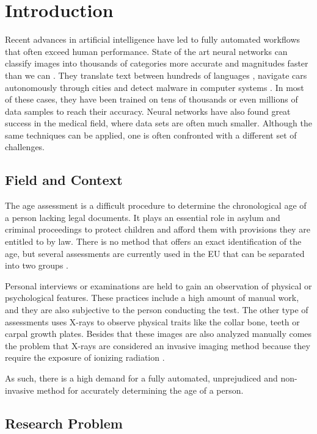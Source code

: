 \section{Introduction}

Recent advances in artificial intelligence have led to fully automated workflows that often exceed human performance. State of the art neural networks can classify images into thousands of categories more accurate and magnitudes faster than we can \cite{He2015a}. They translate text between hundreds of languages \cite{Wu2016}, navigate cars autonomously through cities \cite{Bojarski2017} and detect malware in computer systems \cite{Saxe2015}. In most of these cases, they have been trained on tens of thousands or even millions of data samples to reach their accuracy. Neural networks have also found great success in the medical field, where data sets are often much smaller. Although the same techniques can be applied, one is often confronted with a different set of challenges.

\subsection{Field and Context}

The age assessment is a difficult procedure to determine the chronological age of a person lacking legal documents. It plays an essential role in asylum and criminal proceedings to protect children and afford them with provisions they are entitled to by law. There is no method that offers an exact identification of the age, but several assessments are currently used in the EU that can be separated into two groups \cite{EuropeanAsylumSupportOffice2013}.

Personal interviews or examinations are held to gain an observation of physical or psychological features. These practices include a high amount of manual work, and they are also subjective to the person conducting the test. The other type of assessments uses X-rays to observe physical traits like the collar bone, teeth or carpal growth plates. Besides that these images are also analyzed manually comes the problem that X-rays are considered an invasive imaging method because they require the exposure of ionizing radiation \cite{EuropeanAsylumSupportOffice2013}.

As such, there is a high demand for a fully automated, unprejudiced and non-invasive method for accurately determining the age of a person.

\subsection{Research Problem}

